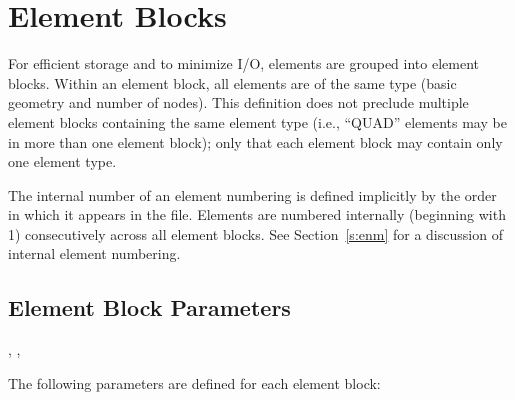 \section{Element Blocks}

For efficient storage and to minimize I/O, elements are grouped into
element blocks. Within an element block, all elements are of the same
type (basic geometry and number of nodes). This definition does not
preclude multiple element blocks containing the same element type
(i.e., ``QUAD'' elements may be in more than one element block); only
that each element block may contain only one element type.

The internal number of an element numbering is defined implicitly by
the order in which it appears in the file. Elements are numbered
internally (beginning with 1) consecutively across all element
blocks. See Section~\ref{s:enm} for a discussion of internal element
numbering.

\subsection{Element Block Parameters}\label{s:ebp}

\begin{spacing}{1.5}
\api {}, , 
\end{spacing}

The following parameters are defined for each element block:

